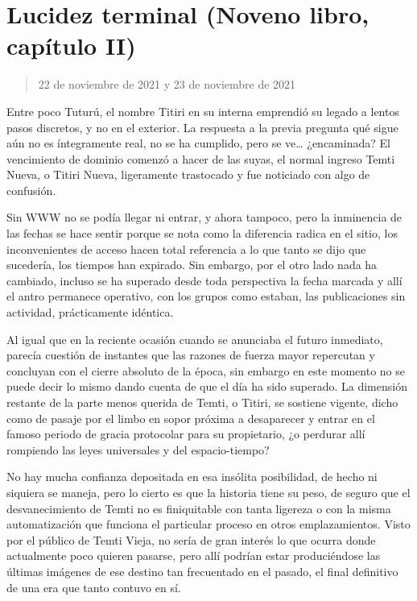 \documentclass[
]{book}
\begin{document}
\hypertarget{lucidez-terminal-noveno-libro-capuxedtulo-ii}{%
\section{Lucidez terminal (Noveno libro, capítulo II)}\label{lucidez-terminal-noveno-libro-capuxedtulo-ii}}

\begin{quote}
22 de noviembre de 2021 y 23 de noviembre de 2021
\end{quote}

Entre poco Tuturú, el nombre Titiri en su interna emprendió su legado a lentos pasos discretos, y no en el exterior. La respuesta a la previa pregunta qué sigue aún no es íntegramente real, no se ha cumplido, pero se ve\ldots{} ¿encaminada? El vencimiento de dominio comenzó a hacer de las suyas, el normal ingreso Temti Nueva, o Titiri Nueva, ligeramente trastocado y fue noticiado con algo de confusión.

Sin WWW no se podía llegar ni entrar, y ahora tampoco, pero la inminencia de las fechas se hace sentir porque se nota como la diferencia radica en el sitio, los inconvenientes de acceso hacen total referencia a lo que tanto se dijo que sucedería, los tiempos han expirado. Sin embargo, por el otro lado nada ha cambiado, incluso se ha superado desde toda perspectiva la fecha marcada y allí el antro permanece operativo, con los grupos como estaban, las publicaciones sin actividad, prácticamente idéntica.

Al igual que en la reciente ocasión cuando se anunciaba el futuro inmediato, parecía cuestión de instantes que las razones de fuerza mayor repercutan y concluyan con el cierre absoluto de la época, sin embargo en este momento no se puede decir lo mismo dando cuenta de que el día ha sido superado. La dimensión restante de la parte menos querida de Temti, o Titiri, se sostiene vigente, dicho como de pasaje por el limbo en sopor próxima a desaparecer y entrar en el famoso periodo de gracia protocolar para su propietario, ¿o perdurar allí rompiendo las leyes universales y del espacio-tiempo?

No hay mucha confianza depositada en esa insólita posibilidad, de hecho ni siquiera se maneja, pero lo cierto es que la historia tiene su peso, de seguro que el desvanecimiento de Temti no es finiquitable con tanta ligereza o con la misma automatización que funciona el particular proceso en otros emplazamientos. Visto por el público de Temti Vieja, no sería de gran interés lo que ocurra donde actualmente poco quieren pasarse, pero allí podrían estar produciéndose las últimas imágenes de ese destino tan frecuentado en el pasado, el final definitivo de una era que tanto contuvo en sí.
\end{document}
